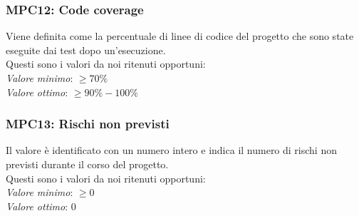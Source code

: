 \subsubsection{MPC12: Code coverage}
Viene definita come la percentuale di linee di codice del progetto che sono state eseguite dai test dopo un'esecuzione.\\
Questi sono i valori da noi ritenuti opportuni:\\
\textit{Valore minimo}: $ \ge 70\% $\\
\textit{Valore ottimo}: $ \ge 90\% - 100\% $\\

\subsubsection{MPC13: Rischi non previsti}
Il valore è identificato con un numero intero e indica il numero di rischi non previsti durante il corso del progetto.\\
Questi sono i valori da noi ritenuti opportuni:\\
\textit{Valore minimo}: $ \ge 0$\\
\textit{Valore ottimo}: 0\\